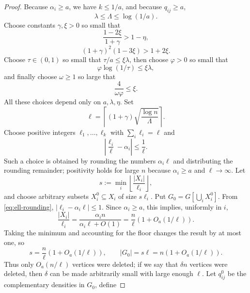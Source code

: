 \documentclass{article}
\begin{document}
\begin{proof}
Because $\alpha_i\ge a$, we have $k\le1/a$, and because $q_{ij}\ge a$,
\begin{equation}\label{eq:Lambda-upper}
 \lambda\le\Lambda\le\log(1/a).
\end{equation}
Choose constants $\gamma,\xi>0$ so small that
\begin{equation}\label{eq:gamma-delta-choices}
 \frac{1-2\xi}{1+\gamma}>1-\eta,
\end{equation}
\begin{equation}\label{eq:gamma-delta-choices2}
(1+\gamma)^2(1-3\xi)>1+2\xi.
\end{equation} Choose $\tau\in(0,1)$ so small that $\tau/a\le\xi\lambda$, then choose $\varphi>0$ so small that
\[
 \varphi\log(1/\tau)\le\xi\lambda,
\]
and finally choose $\omega\ge1$ so large that
\begin{equation}\label{eq:omega-choice}
 \frac4{\omega\varphi}\le\xi.
\end{equation}
All these choices depend only on $a,\lambda,\eta$. Set
\begin{equation}\label{eq:ell-choice}
 \ell=\left\lceil(1+\gamma)\sqrt{\frac{\log n}{\Lambda}}\right\rceil.
\end{equation}
Choose positive integers $\ell_1,\dots,\ell_k$ with $\sum_i\ell_i=\ell$ and
\begin{equation}\label{eq:ell-rounding}
 \left|\frac{\ell_i}{\ell}-\alpha_i\right|\le\frac1\ell.
\end{equation}
Such a choice is obtained by rounding the numbers $\alpha_i\ell$ and distributing the rounding remainder; positivity holds for large $n$ because $\alpha_i\ge a$ and $\ell\to\infty$.   Let
\[
 s:=\min_i\left\lfloor\frac{|X_i|}{\ell_i}\right\rfloor,
\]
and choose arbitrary subsets $X_i^0\subseteq X_i$ of size $s\ell_i$.  Put $G_0=G[\bigcup_iX_i^0]$.  From \eqref{eq:ell-rounding}, $|\ell_i-\alpha_i\ell|\le1$.  Since $\alpha_i\ge a$, this implies, uniformly in $i$,
\[
 \frac{|X_i|}{\ell_i}=\frac{\alpha_i n}{\alpha_i\ell+O(1)}
 =\frac n\ell\left(1+O_a(1/\ell)\right).
\]
Taking the minimum and accounting for the floor changes the result by at most one, so
\begin{equation}\label{eq:s-asymptotic}
 s=\frac n\ell\left(1+O_a(1/\ell)\right),
 \qquad
 |G_0|=s\ell=n\left(1+O_a(1/\ell)\right).
\end{equation}
Thus only $O_a(n/\ell)$ vertices were deleted; if we say that $\delta n$ vertices were deleted, then $\delta$ can be made arbitrarily small with large enough $\ell$. Let $q_{ij}^0$ be the complementary densities in $G_0$, define

\end{proof}
\end{document}
